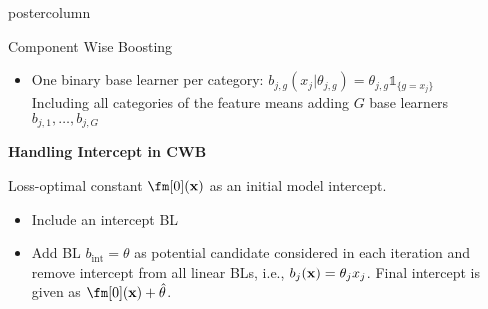 \documentclass{beamer}
\begin{document}
\begin{frame}[fragile]{}
\begin{columns}
\begin{column}{.31\textwidth}
\begin{beamercolorbox}[center]{postercolumn}
\begin{minipage}{.98\textwidth}
{\begin{myblock}{Component Wise Boosting}
\begin{itemize}[$\bullet$]
    \item 
        One binary base learner per category: $b_{j,g}(x_j | \theta_{j,g}) = \theta_{j,g}\mathds{1}_{\{g = x_j\}}$\\
        Including all categories of the feature means adding $G$ base learners $b_{j,1}, \dots, b_{j,G}$ %
  \end{itemize}
  
  \begin{codebox}
  \textbf{Handling Intercept in CWB}
\end{codebox}
  Loss-optimal constant $\fm[0](\xv)$ as an initial model intercept.
\begin{itemize}[$\bullet$] 
  \setlength{\itemindent}{+.3in}
\item Include an intercept BL
\item Add BL $b_{\text{int}} = \theta$ as potential candidate considered in each iteration and remove intercept from all linear BLs, i.e., $b_j(\mathbf{x}) = \theta_j x_j$.
    Final intercept is given as $\fm[0](\xv) + \hat{\theta}$.
   \end{itemize}

\end{myblock}
  }
  
  \end{minipage}
  \end{beamercolorbox}
  \end{column}
  
  
  
\end{columns}
\end{frame}
\end{document}
